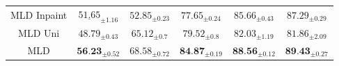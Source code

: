 \begin{table}[H]
{\begin{tabular}{c|c|cccc}
    \midrule
    \gls{MLD Inpaint} & $\underline{51.65}_{\pm 1.16 }$ &  $52.85_{\pm 0.23 }$ &
    $77.65_{\pm0.24} $& 
    $85.66_{\pm 0.43} $&
    $87.29_{ \pm 0.29  }$ \\
    

    \gls{MLD Uni} & 
    $48.79_{\pm 0.43 }$ &  
    $65.12_{\pm 0.7 }$ &
    $79.52_{\pm0.8} $&
    $82.03_{\pm 1.19} $&
    $81.86_{ \pm 2.09  }$ 
    \\

    \gls{MLD} & $\textbf{56.23}_{ \pm 0.52}$ & $68.58_{\pm 0.72} $&$ \textbf{84.87}_{\pm 0.19}$ & $\textbf{88.56}_{ \pm 0.12} $ &$ \textbf{89.43}_{\pm 0.27}  $ \\
    
    \bottomrule
\end{tabular}}
\label{tab:mmnist_detail}
\end{table}





